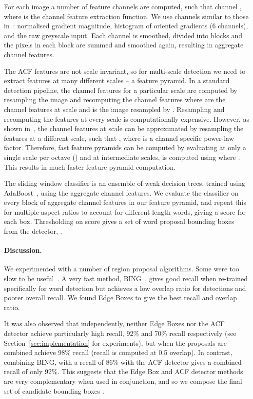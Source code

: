 \documentclass[twocolumn]{svjour3}          \smartqed  \usepackage{epsfig}
\begin{document}
For each image  a number of feature channels are computed, such that channel , where  is the channel feature extraction function. We use channels similar to those in~\cite{Dollar10}: normalised gradient magnitude, histogram of oriented gradients (6 channels), and the raw greyscale input. Each channel  is smoothed, divided into blocks and the pixels in each block are summed and smoothed again, resulting in aggregate channel features. 

The ACF features are not scale invariant, so for multi-scale detection we need to extract features at many different scales -- a feature pyramid. In a standard detection pipeline, the channel features for a particular scale  are computed by resampling the image and recomputing the channel features  where  are the channel features at scale  and  is the image resampled by . Resampling and recomputing the features at every scale is computationally expensive. However, as shown in~\cite{Dollar10,Dollar14}, the channel features at scale  can be approximated by resampling the features at a different scale, such that , where  is a channel specific power-law factor. Therefore, fast feature pyramids can be computed by evaluating  at only a single scale per octave () and at intermediate scales,  is computed using  where . This results in much faster feature pyramid computation.

The sliding window classifier is an ensemble of weak decision trees, trained using AdaBoost~\cite{Friedman00}, using the aggregate channel features. We evaluate the classifier on every block of aggregate channel features in our feature pyramid, and repeat this for multiple aspect ratios to account for different length words, giving a score for each box. Thresholding on score gives a set of word proposal bounding boxes from the detector, .

\paragraph{Discussion.}
We experimented with a number of region proposal algorithms. Some were too slow to be useful~\cite{Uijlings13,Alexe12}. A very fast method, BING~\cite{Cheng14}, gives good recall when re-trained specifically for word detection but achieves a low overlap ratio for detections and poorer overall recall. We found Edge Boxes to give the best recall and overlap ratio.

It was also observed that independently, neither Edge Boxes nor the ACF detector achieve particularly high recall, 92\% and 70\% recall respectively (see Section~\ref{sec:implementation} for experiments), but when the proposals are combined achieve 98\% recall (recall is computed at 0.5 overlap). In contrast, combining BING, with a recall of 86\% with the ACF detector gives a combined recall of only 92\%. This suggests that the Edge Box and ACF detector methods are very complementary when used in conjunction, and so we compose the final set of candidate bounding boxes .
\end{document}
